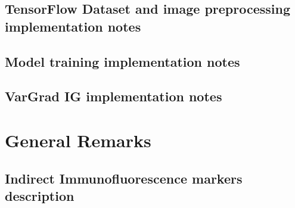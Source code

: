 \documentclass[biblatexBackend=bibtex]{tumthesis}
\begin{document}
\section{TensorFlow Dataset and image preprocessing implementation notes}
\label{sec:appendix:tfds}


\section{Model training implementation notes}
\label{sec:appendix:Model_training_IN}
%

\section{VarGrad IG implementation notes}
\label{sec:appendix:VarGrad_IG_Experimental_Setup}


\chapter{General Remarks}
\label{Appendix-general-remarks}


\section{Indirect Immunofluorescence markers description}
\label{sec:appendix:if_markers}


\backmatter


\listoffigures

\vspace*{1.5cm}

\listoftables




\end{document}

